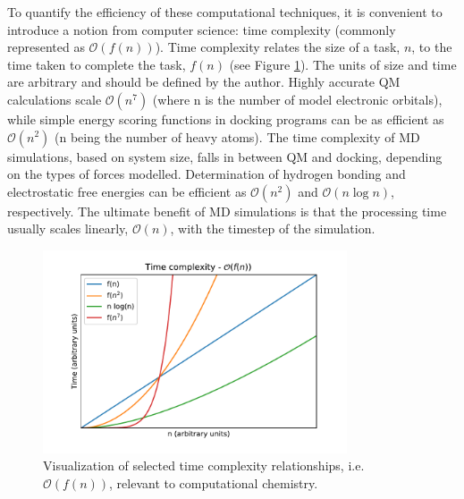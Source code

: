 \documentclass[journal=jctcce,manuscript=article]{achemso}
\begin{document}
{To quantify the efficiency of these computational techniques, it is convenient to introduce a notion from computer science: time complexity (commonly represented as $\mathcal{O}(f(n))$).\cite{Goldreich2008ComputationalComplexity} Time complexity relates the size of a task, $n$, to the time taken to complete the task, $f(n)$ (see Figure \ref{fig:timecomplexity}).\cite{ButterfieldAScience} The units of size and time are arbitrary and should be defined by the author. Highly accurate \ac{QM} calculations scale $\mathcal{O}(n^{7})$ (where n is the number of model electronic orbitals), while simple energy scoring functions in docking programs can be as efficient as $\mathcal{O}(n^{2})$ (n being the number of heavy atoms). \cite{Jensen2007IntroductionEdition, Engler2018Multiple-ChoiceMolecules, Krippahl2005ApplyingDocking} 
The time complexity of \ac{MD} simulations, based on system size, falls in between \ac{QM} and docking, depending on the types of forces modelled. Determination of hydrogen bonding and electrostatic free energies can be efficient as $\mathcal{O}(n^{2})$ and $\mathcal{O}(n \log n)$, respectively.\cite{Trobec1997TheAlgorithms} The ultimate benefit of MD simulations is that the processing time usually scales linearly, $\mathcal{O}(n)$, with the timestep of the simulation.\cite{Anderson2008GeneralUnits}

\begin{figure}[tl!]
    \centering
    \includegraphics[width=9cm]{timecomplexity.pdf}
    \caption{Visualization of selected time complexity relationships, i.e. $\mathcal{O}(f(n))$, relevant to computational chemistry. }
    \label{fig:timecomplexity}
\end{figure}

}
\end{document}
